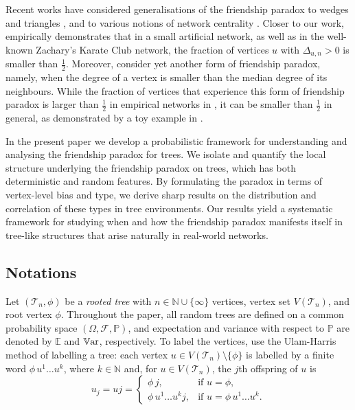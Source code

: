 \documentclass[11pt]{article}
\numberwithin{equation}{section}
\theoremstyle{plain}
\newcommand{\EE}{\mathbb E}
\newcommand{\PP}{\mathbb{P}}
\begin{document}
Recent works have considered generalisations of the friendship paradox to wedges and triangles \cite{BGHJS}, and to various notions of network centrality \cite{HV}. Closer to our work, \cite{Lee2026} empirically demonstrates that in a small artificial network, as well as in the well-known Zachary's Karate Club network, the fraction of vertices $u$ with $\Delta_{u,n}>0$ is smaller than $\tfrac12$. Moreover, \cite{Lerman2025,Lee2026} consider yet another form of friendship paradox, namely, when the degree of a vertex is smaller than the median degree of its neighbours.  While the fraction of vertices that experience this form of friendship paradox is larger than $\tfrac12$ in empirical networks in \cite{Lerman2025,Lee2026}, it can be smaller than $\tfrac12$ in general, as demonstrated by a toy example in \cite{Lee2026}.

In the present paper we develop a probabilistic framework for understanding and analysing the friendship paradox for trees. We isolate and quantify the local structure underlying the friendship paradox on trees, which has both deterministic and random features. By formulating the paradox in terms of vertex-level bias and type, we derive sharp results on the distribution and correlation of these types in tree environments. Our results yield a systematic framework for studying when and how the friendship paradox manifests itself in tree-like structures that arise naturally in real-world networks.



\subsection{Notations}
\label{sec:AP-not}

Let $(\mathcal{T}_n,\phi)$ be a \emph{rooted tree} with $n \in \mathbb{N} \cup \{\infty\}$ vertices, vertex set $V(\mathcal{T}_n)$, and root vertex $\phi$. Throughout the paper, all random trees are defined on a common probability space $(\Omega,\mathcal{F},\PP)$, and expectation and variance with respect to $\PP$ are denoted by $\EE$ and $\mathbb{V}{\rm ar}$, respectively. To label the vertices, use the Ulam-Harris method of labelling a tree: each vertex $u \in V(\mathcal{T}_n) \setminus \{\phi\}$ is labelled by a finite word $\phi\, u^1 \ldots u^k$, where $k \in \mathbb{N}$ and, for $u \in V(\mathcal{T}_n)$, the $j$th offspring of $u$ is
\[
u_{j} = uj = \left\{
\begin{array}{ll}
\phi\, j, &\text{if $u=\phi$},\\[0.2cm]
\phi\, u^{1}\ldots u^{k} j, &\text{if $u=\phi\, u^{1}\ldots u^{k}$}.
\end{array} 
\right. 
\]
\end{document}
